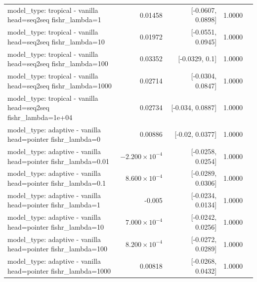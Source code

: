 \documentclass[10pt]{article}
\makeatletter
\newcommand{\stackcell}[1]{\begin{tabular}[t]{@{}l@{}}#1\end{tabular}}
\makeatother
\begin{document}
{\begin{longtable}{lrrrl}
\stackcell{model\_type: tropical - vanilla\\\footnotesize head=seq2seq fishr\_lambda=1 } & 0.01458 & [-0.0607, 0.0898] & 1.0000 & \\
\stackcell{model\_type: tropical - vanilla\\\footnotesize head=seq2seq fishr\_lambda=10 } & 0.01972 & [-0.0551, 0.0945] & 1.0000 & \\
\stackcell{model\_type: tropical - vanilla\\\footnotesize head=seq2seq fishr\_lambda=100 } & 0.03352 & [-0.0329, 0.1] & 1.0000 & \\
\stackcell{model\_type: tropical - vanilla\\\footnotesize head=seq2seq fishr\_lambda=1000 } & 0.02714 & [-0.0304, 0.0847] & 1.0000 & \\
\stackcell{model\_type: tropical - vanilla\\\footnotesize head=seq2seq fishr\_lambda=1e+04 } & 0.02734 & [-0.034, 0.0887] & 1.0000 & \\
\stackcell{model\_type: adaptive - vanilla\\\footnotesize head=pointer fishr\_lambda=0 } & 0.00886 & [-0.02, 0.0377] & 1.0000 & \\
\stackcell{model\_type: adaptive - vanilla\\\footnotesize head=pointer fishr\_lambda=0.01 } & $-2.200\times10^{-4}$ & [-0.0258, 0.0254] & 1.0000 & \\
\stackcell{model\_type: adaptive - vanilla\\\footnotesize head=pointer fishr\_lambda=0.1 } & $8.600\times10^{-4}$ & [-0.0289, 0.0306] & 1.0000 & \\
\stackcell{model\_type: adaptive - vanilla\\\footnotesize head=pointer fishr\_lambda=1 } & -0.005 & [-0.0234, 0.0134] & 1.0000 & \\
\stackcell{model\_type: adaptive - vanilla\\\footnotesize head=pointer fishr\_lambda=10 } & $7.000\times10^{-4}$ & [-0.0242, 0.0256] & 1.0000 & \\
\stackcell{model\_type: adaptive - vanilla\\\footnotesize head=pointer fishr\_lambda=100 } & $8.200\times10^{-4}$ & [-0.0272, 0.0289] & 1.0000 & \\
\stackcell{model\_type: adaptive - vanilla\\\footnotesize head=pointer fishr\_lambda=1000 } & 0.00818 & [-0.0268, 0.0432] & 1.0000 & \\

\end{longtable}}
\end{document}
